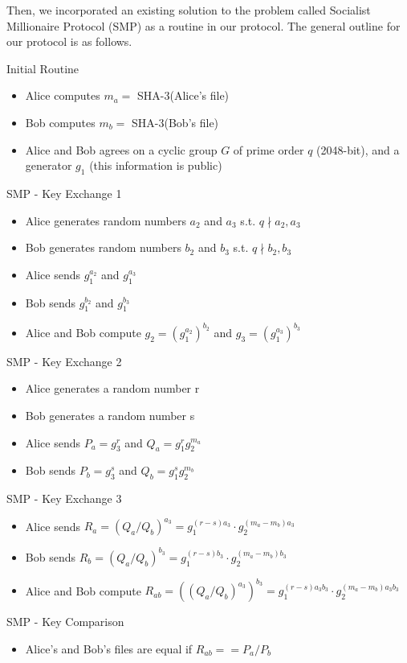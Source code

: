 \documentclass{article}
\begin{document}
Then, we incorporated an existing solution to the problem called Socialist Millionaire
Protocol (SMP) as a routine in our protocol. The general outline for our protocol is as 
follows.


Initial Routine

\begin{itemize}
  \item Alice computes $m_a = $ SHA-3(Alice's file)
  \item Bob computes $m_b = $ SHA-3(Bob's file)
  \item Alice and Bob agrees on a cyclic group $G$ of prime order $q$ (2048-bit), 
    and a generator $g_1$
    (this information is public)
\end{itemize}

SMP - Key Exchange 1
\begin{itemize}
  \item Alice generates random numbers $a_2$ and $a_3$ s.t. $q \nmid a_2, a_3$
  \item Bob generates random numbers $b_2$ and $b_3$ s.t. $q \nmid b_2, b_3$
  \item Alice sends $g_1^{a_2}$ and $g_1^{a_3}$
  \item Bob sends $g_1^{b_2}$ and $g_1^{b_3}$
  \item Alice and Bob compute $g_2 = (g_1^{a_2})^{b_2}$ and $g_3 = (g_1^{a_3})^{b_3}$
\end{itemize}

SMP - Key Exchange 2
\begin{itemize}
  \item Alice generates a random number r
  \item Bob generates a random number s
  \item Alice sends $P_a = g_3^r$ and $Q_a = g_1^rg_2^{m_a}$
  \item Bob sends $P_b = g_3^s$ and $Q_b = g_1^sg_2^{m_b}$
\end{itemize}

SMP - Key Exchange 3
\begin{itemize}
  \item Alice sends $R_a = (Q_a/Q_b)^{a_3} = g_1^{(r-s)a_3}\cdot g_2^{(m_a-m_b)a_3}$
  \item Bob sends $R_b = (Q_a/Q_b)^{b_3} = g_1^{(r-s)b_3}\cdot g_2^{(m_a-m_b)b_3}$
  \item Alice and Bob compute $R_{ab} = ((Q_a/Q_b)^{a_3})^{b_3} = 
  g_1^{(r-s)a_3b_3} \cdot g_2^{(m_a-m_b)a_3b_3}$
\end{itemize}
SMP - Key Comparison
\begin{itemize}
  \item Alice's and Bob's files are equal if $R_{ab} == P_a / P_b$
\end{itemize}
\end{document}
